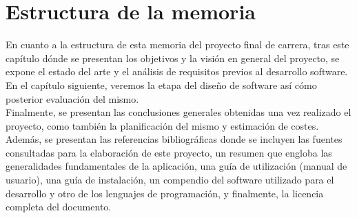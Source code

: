 \section{Estructura de la memoria}

En cuanto a la estructura de esta memoria del proyecto final de carrera, tras este capítulo dónde se presentan los objetivos y la visión en general del proyecto, se expone el estado del arte y el análisis de requisitos previos al desarrollo software.\\

En el capítulo siguiente, veremos la etapa del diseño de software así cómo posterior evaluación del mismo.\\

Finalmente, se presentan las conclusiones generales obtenidas una vez realizado el proyecto, como también la planificación del mismo y estimación de costes.\\

Además, se presentan las referencias bibliográficas donde se incluyen las fuentes consultadas para la elaboración de este proyecto, un resumen que engloba las generalidades fundamentales de la aplicación, una guía de utilización (manual de usuario), una guía de instalación, un compendio del software utilizado para el desarrollo y otro de los lenguajes de programación, y finalmente, la licencia completa del documento.\\
